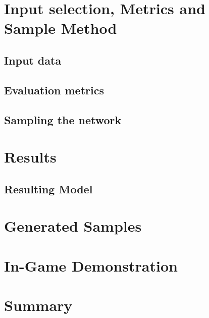 \section{Input selection, Metrics and Sample Method}
\label{sec:input_metrics_sample}
\subsection{Input data}
\label{sec:InputSelection}

\subsection{Evaluation metrics}
\label{sec:evaluation}
\subsection{Sampling the network}


\section{Results}
\label{sec:results}
\subsection{Resulting Model}
\label{sec:sampling}
\section{Generated Samples}
\section{In-Game Demonstration}
\section{Summary}